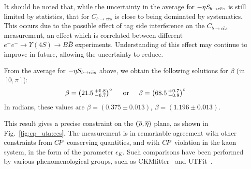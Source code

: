 



It should be noted that, while the uncertainty in the average for 
$-\etacp S_{b \to c\bar c s}$ is still limited by statistics,
that for $C_{b \to c\bar c s}$ is close to being dominated by systematics.
This occurs due to the possible effect of tag side interference on the
$C_{b \to c\bar c s}$ measurement, an effect which is correlated between
different $e^+e^- \to \Upsilon(4S) \to B\bar{B}$ experiments.
Understanding of this effect may continue to improve in future,
allowing the uncertainty to reduce.

From the average for $-\etacp S_{b \to c\bar c s}$ above, 
we obtain the following solutions for $\beta$
(in $\left[ 0, \pi \right]$):
\begin{equation}
  \beta = \left( 21.5 \,^{+0.8}_{-0.7} \right)^\circ
  \hspace{5mm}
  {\rm or}
  \hspace{5mm}
  \beta = \left( 68.5 \,^{+0.7}_{-0.8} \right)^\circ
  \label{eq:cp_uta:sin2beta}
\end{equation}
In radians, these values are 
$\beta = \left( 0.375 \pm 0.013 \right)$, 
$\beta = \left( 1.196 \pm 0.013 \right)$.

This result gives a precise constraint on the $(\overline{\rho},\overline{\eta})$ plane,
as shown in Fig.~\ref{fig:cp_uta:ccs}.
The measurement is in remarkable agreement with other constraints from 
$C\!P$ conserving quantities, 
and with $C\!P$ violation in the kaon system, in the form of the parameter $\epsilon_K$.
Such comparisons have been performed by various phenomenological groups,
such as CKMfitter~\cite{Charles:2004jd} 
and UTFit~\cite{Bona:2005vz}.

